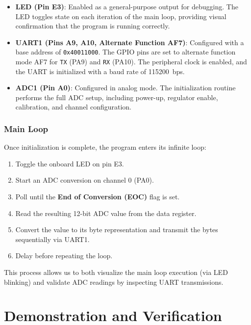 \documentclass[12pt,a4paper]{article}
\begin{document}
\begin{itemize}
    \item \textbf{LED (Pin E3)}: Enabled as a general-purpose output for debugging. The LED toggles state on each iteration of the main loop, providing visual confirmation that the program is running correctly.
    \item \textbf{UART1 (Pins A9, A10, Alternate Function AF7)}: Configured with a base address of \texttt{0x40011000}. The GPIO pins are set to alternate function mode AF7 for \texttt{TX} (PA9) and \texttt{RX} (PA10). The peripheral clock is enabled, and the UART is initialized with a baud rate of \SI{115200}{bps}.
    \item \textbf{ADC1 (Pin A0)}: Configured in analog mode. The initialization routine performs the full ADC setup, including power-up, regulator enable, calibration, and channel configuration.
\end{itemize}

\subsubsection{Main Loop}

Once initialization is complete, the program enters its infinite loop:

\begin{enumerate}
    \item Toggle the onboard LED on pin E3.
    \item Start an ADC conversion on channel 0 (PA0).
    \item Poll until the \textbf{End of Conversion (EOC)} flag is set.
    \item Read the resulting 12-bit ADC value from the data register.
    \item Convert the value to its byte representation and transmit the bytes sequentially via UART1.
    \item Delay before repeating the loop.
\end{enumerate}

This process allows us to both visualize the main loop execution (via LED blinking) and validate ADC readings by inspecting UART transmissions.


\section{Demonstration and Verification}
\end{document}
